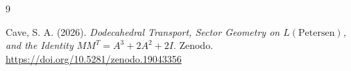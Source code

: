 \begin{thebibliography}{9}

Cave, S. A. (2026).
\emph{Dodecahedral Transport, Sector Geometry on \(L(\mathrm{Petersen})\), and the Identity \(MM^T = A^3 + 2A^2 + 2I\)}.
Zenodo.
\url{https://doi.org/10.5281/zenodo.19043356}

\end{thebibliography}
